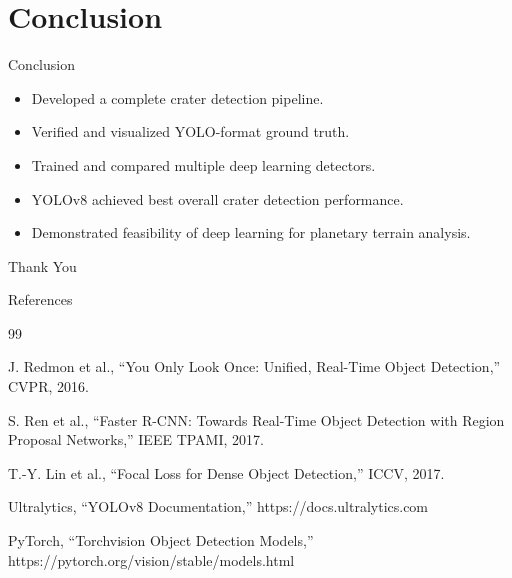 \documentclass{beamer}
\begin{document}
	\section{Conclusion}
	
	\begin{frame}{Conclusion}
		
		\begin{itemize}
			\item Developed a complete crater detection pipeline.
			\item Verified and visualized YOLO-format ground truth.
			\item Trained and compared multiple deep learning detectors.
			\item YOLOv8 achieved best overall crater detection performance.
			\item Demonstrated feasibility of deep learning for planetary terrain analysis.
		\end{itemize}
		
		\vspace{0.6cm}
		
		\begin{center}
			\Large
			Thank You
		\end{center}
		
	\end{frame}
	
	\begin{frame}{References}
		
		\footnotesize
		
		\begin{thebibliography}{99}
			
			J. Redmon et al.,
			``You Only Look Once: Unified, Real-Time Object Detection,''
			CVPR, 2016.
			
			S. Ren et al.,
			``Faster R-CNN: Towards Real-Time Object Detection with Region Proposal Networks,''
			IEEE TPAMI, 2017.
			
			T.-Y. Lin et al.,
			``Focal Loss for Dense Object Detection,''
			ICCV, 2017.
			
			Ultralytics,
			``YOLOv8 Documentation,''
			https://docs.ultralytics.com
			
			PyTorch,
			``Torchvision Object Detection Models,''
			https://pytorch.org/vision/stable/models.html
			
		\end{thebibliography}
		
	\end{frame}
	
\end{document}
